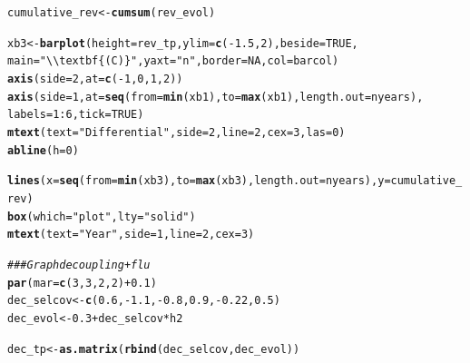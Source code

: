 \documentclass{article}\usepackage[]{graphicx}\usepackage[]{color}
\makeatletter
\newcommand{\hlnum}[1]{\textcolor[rgb]{0.686,0.059,0.569}{#1}}%
\newcommand{\hlstr}[1]{\textcolor[rgb]{0.192,0.494,0.8}{#1}}%
\newcommand{\hlcom}[1]{\textcolor[rgb]{0.678,0.584,0.686}{\textit{#1}}}%
\newcommand{\hlopt}[1]{\textcolor[rgb]{0,0,0}{#1}}%
\newcommand{\hlstd}[1]{\textcolor[rgb]{0.345,0.345,0.345}{#1}}%
\newcommand{\hlkwb}[1]{\textcolor[rgb]{0.69,0.353,0.396}{#1}}%
\newcommand{\hlkwc}[1]{\textcolor[rgb]{0.333,0.667,0.333}{#1}}%
\newcommand{\hlkwd}[1]{\textcolor[rgb]{0.737,0.353,0.396}{\textbf{#1}}}%
\newenvironment{kframe}{%
 \def\at@end@of@kframe{}%
 \ifinner\ifhmode%
  \def\at@end@of@kframe{\end{minipage}}%
  \begin{minipage}{\columnwidth}%
 \fi\fi%
 \def\FrameCommand##1{\hskip\@totalleftmargin \hskip-\fboxsep
 \colorbox{shadecolor}{##1}\hskip-\fboxsep
     \hskip-\linewidth \hskip-\@totalleftmargin \hskip\columnwidth}%
 \MakeFramed {\advance\hsize-\width
   \@totalleftmargin\z@ \linewidth\hsize
   \@setminipage}}%
 {\par\unskip\endMakeFramed%
 \at@end@of@kframe}
\newenvironment{knitrout}{}{} %
\makeatother
\begin{document}
\begin{knitrout}
\begin{kframe}
\begin{alltt}
\hlstd{cumulative_rev} \hlkwb{<-} \hlkwd{cumsum}\hlstd{(rev_evol)}

\hlstd{xb3} \hlkwb{<-} \hlkwd{barplot}\hlstd{(}\hlkwc{height} \hlstd{= rev_tp,} \hlkwc{ylim} \hlstd{=} \hlkwd{c}\hlstd{(}\hlopt{-}\hlnum{1.5}\hlstd{,}\hlnum{2}\hlstd{),} \hlkwc{beside} \hlstd{=} \hlnum{TRUE}\hlstd{,}
               \hlkwc{main}\hlstd{=}\hlstr{"\textbackslash{}\textbackslash{}textbf\{(C)\}"}\hlstd{,} \hlkwc{yaxt}\hlstd{=}\hlstr{"n"}\hlstd{,} \hlkwc{border} \hlstd{=} \hlnum{NA}\hlstd{,} \hlkwc{col} \hlstd{= barcol )}
\hlkwd{axis}\hlstd{(}\hlkwc{side}\hlstd{=}\hlnum{2}\hlstd{,} \hlkwc{at} \hlstd{=} \hlkwd{c}\hlstd{(}\hlopt{-}\hlnum{1}\hlstd{,}\hlnum{0}\hlstd{,}\hlnum{1}\hlstd{,}\hlnum{2}\hlstd{))}
\hlkwd{axis}\hlstd{(}\hlkwc{side}\hlstd{=}\hlnum{1}\hlstd{,} \hlkwc{at} \hlstd{=} \hlkwd{seq}\hlstd{(}\hlkwc{from}\hlstd{=}\hlkwd{min}\hlstd{(xb1),} \hlkwc{to}\hlstd{=}\hlkwd{max}\hlstd{(xb1),} \hlkwc{length.out} \hlstd{= nyears),}
     \hlkwc{labels} \hlstd{=} \hlnum{1}\hlopt{:}\hlnum{6}\hlstd{,}\hlkwc{tick} \hlstd{=} \hlnum{TRUE}\hlstd{)}
\hlkwd{mtext}\hlstd{(}\hlkwc{text} \hlstd{=} \hlstr{"Differential"}\hlstd{,} \hlkwc{side} \hlstd{=} \hlnum{2}\hlstd{,} \hlkwc{line} \hlstd{=} \hlnum{2}\hlstd{,} \hlkwc{cex}\hlstd{=}\hlnum{3}\hlstd{,} \hlkwc{las}\hlstd{=}\hlnum{0}\hlstd{)}
\hlkwd{abline}\hlstd{(}\hlkwc{h}\hlstd{=}\hlnum{0}\hlstd{)}

\hlkwd{lines}\hlstd{(}\hlkwc{x}\hlstd{=}\hlkwd{seq}\hlstd{(}\hlkwc{from}\hlstd{=}\hlkwd{min}\hlstd{(xb3),} \hlkwc{to}\hlstd{=}\hlkwd{max}\hlstd{(xb3),} \hlkwc{length.out} \hlstd{= nyears),} \hlkwc{y}\hlstd{=cumulative_rev)}
\hlkwd{box}\hlstd{(}\hlkwc{which} \hlstd{=} \hlstr{"plot"}\hlstd{,} \hlkwc{lty} \hlstd{=} \hlstr{"solid"}\hlstd{)}
\hlkwd{mtext}\hlstd{(}\hlkwc{text} \hlstd{=} \hlstr{"Year"}\hlstd{,} \hlkwc{side} \hlstd{=} \hlnum{1}\hlstd{,} \hlkwc{line} \hlstd{=} \hlnum{2}\hlstd{,} \hlkwc{cex}\hlstd{=}\hlnum{3}\hlstd{)}


\hlcom{### Graph decoupling + flu}
\hlkwd{par}\hlstd{(}\hlkwc{mar}\hlstd{=}\hlkwd{c}\hlstd{(}\hlnum{3}\hlstd{,} \hlnum{3}\hlstd{,} \hlnum{2}\hlstd{,} \hlnum{2}\hlstd{)} \hlopt{+} \hlnum{0.1}\hlstd{)}
\hlstd{dec_selcov} \hlkwb{<-} \hlkwd{c}\hlstd{(}\hlnum{0.6}\hlstd{,}\hlopt{-}\hlnum{1.1}\hlstd{,}\hlopt{-}\hlnum{0.8}\hlstd{,}\hlnum{0.9}\hlstd{,}\hlopt{-}\hlnum{0.22}\hlstd{,}\hlnum{0.5}\hlstd{)}
\hlstd{dec_evol} \hlkwb{<-} \hlnum{0.3}\hlopt{+}\hlstd{dec_selcov} \hlopt{*} \hlstd{h2}

\hlstd{dec_tp} \hlkwb{<-} \hlkwd{as.matrix}\hlstd{(}\hlkwd{rbind}\hlstd{(dec_selcov, dec_evol))}


\end{alltt}
\end{kframe}
\end{knitrout}
\end{document}
